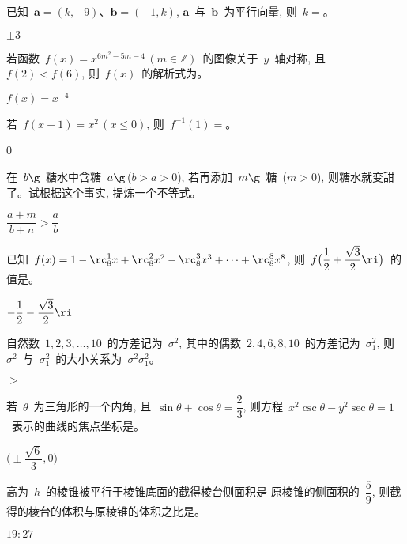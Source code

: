 \documentclass[printbox]{BHCexam}
\begin{document}
\maketitle
\notice

\begin{questions}
\tiankong
\question 已知~$\bm{a}=(k,-9)$、$\bm{b}=(-1,k)$, $\bm{a}$~与~$\bm{b}$~为平行向量,
    则~$k=$\sixb。
\begin{solution}
$\pm3$
\end{solution}
\question 若函数~$f(x)=x^{6m^2-5m-4}\,(m\in\mathbb{Z})$~的图像关于~$y$~轴对称,
    且~$f(2)<f(6)$, 则~$f(x)$~的解析式为\tenb。
\begin{solution}
$f(x)=x^{-4}$
\end{solution}

\question 若~$f(x+1)=x^2\,(x\leq0)$, 则~$f^{-1}(1)=$\sixb。
\begin{solution}
0
\end{solution}

\question 在~$b\g$~糖水中含糖~$a\g$\,($b>a>0$), 若再添加~$m\g$~糖~($m>0$),
    则糖水就变甜了。试根据这个事实, 提炼一个不等式\tenb。
\begin{solution}
$\dfrac{a+m}{b+n}>\dfrac{a}{b}$
\end{solution}

\question 已知~$f(x)=1-\rc_8^1x+\rc_8^2x^2-\rc_8^3x^3+\cdots+\rc_8^8x^8$,
    则~$f\big(\dfrac{1}{2}+\dfrac{\sqrt{3}}{2}\ri\big)$~的值是\sixb\twob{}。
\begin{solution}
$-\dfrac{1}{2}-\dfrac{\sqrt{3}}{2}\ri$
\end{solution}

\question 自然数~$1,2,3,\ldots,10$~的方差记为~$\sigma^2$,
    其中的偶数~$2,4,6,8,10$~的方差记为~$\sigma_1^2$,
    则~$\sigma^2$~与~$\sigma_1^2$~的大小关系为~$\sigma^2$\sixb$\sigma_1^2$。
\begin{solution}
$>$
\end{solution}

\question 若~$\theta$~为三角形的一个内角, 且~$\sin\theta+\cos\theta=\dfrac{2}{3}$,
    则方程~$x^2\csc\theta-y^2\sec\theta=1$~表示的曲线的焦点坐标是\sixb{}。
\begin{solution}
$\big(\pm\dfrac{\sqrt{6}}{3},0\big)$
\end{solution}

\question 高为~$h$~的棱锥被平行于棱锥底面的截得棱台侧面积是
    原棱锥的侧面积的~$\dfrac{5}{9}$,
    则截得的棱台的体积与原棱锥的体积之比是\sixb。
\begin{solution}
$19:27$
\end{solution}


\end{questions}
\end{document}
